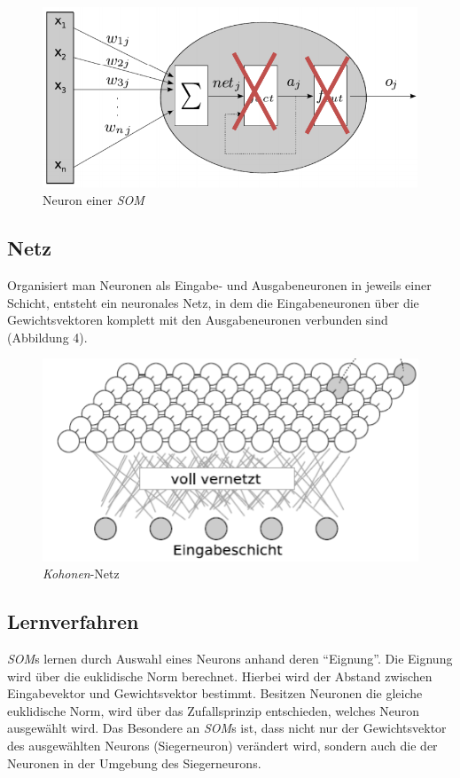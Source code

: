 \documentclass[11pt]{article}
\begin{document}
    \begin{figure}[ht!]
        \centering
        \includegraphics[width=12cm]{../../resources/neuron.png}
        \caption{Neuron einer \textit{SOM}}
    \end{figure}

    \subsection{Netz}
    Organisiert man Neuronen als Eingabe- und Ausgabeneuronen in jeweils einer
    Schicht, entsteht ein neuronales Netz, in dem die Eingabeneuronen über die Gewichtsvektoren
    komplett mit den Ausgabeneuronen verbunden sind (Abbildung 4).

    \begin{figure}[ht!]
        \centering
        \includegraphics[width=12cm]{../../resources/netz.png}
        \caption{\textit{Kohonen}-Netz}
    \end{figure}

    \subsection{Lernverfahren}
    \textit{SOM}s lernen durch Auswahl eines Neurons anhand deren "`Eignung"'. Die Eignung wird
    über die euklidische Norm berechnet. Hierbei wird der Abstand zwischen Eingabevektor und
    Gewichtsvektor bestimmt. Besitzen Neuronen die gleiche euklidische Norm, wird über das
    Zufallsprinzip entschieden, welches Neuron ausgewählt wird. Das Besondere an \textit{SOM}s
    ist, dass nicht nur der Gewichtsvektor des ausgewählten Neurons (Siegerneuron) verändert
    wird, sondern auch die der Neuronen in der Umgebung des Siegerneurons.
    \newpage
\end{document}
